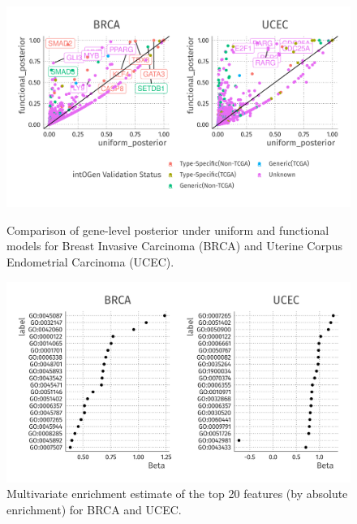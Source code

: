 \begin{figure}
    \centering
    \includegraphics[width=.9\linewidth]{img/fgem_posterior_plot.png}\label{fig:fgem_posterior}
    \caption{Comparison of gene-level posterior under uniform and functional models for  Breast Invasive Carcinoma (BRCA) and Uterine Corpus Endometrial Carcinoma (UCEC).}
\end{figure}

\begin{figure}
    \centering
    \includegraphics[width=.9\linewidth]{img/fgem_enrichment_plot.png}
    \caption{Multivariate enrichment estimate of the top 20 features (by absolute enrichment) for BRCA and UCEC.} 
\end{figure}



